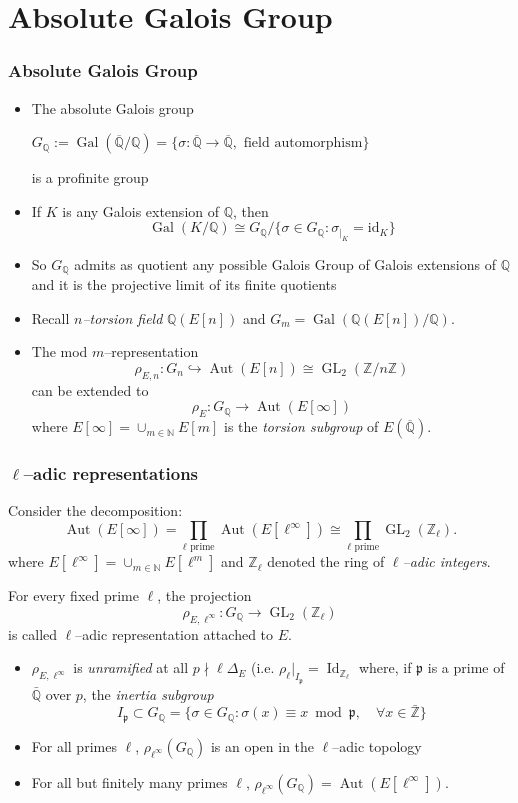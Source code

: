 \documentclass[10pt,final]{beamer} %
\newcommand{\Q}{\mathbb Q}
\newcommand{\Z}{\mathbb Z}
\newcommand{\N}{\mathbb N}
\theoremstyle{definition}
\begin{document}
\section{Absolute Galois Group}
\begin{frame}
\frametitle{Absolute Galois Group} 

\begin{itemize}[<+-| alert@+>]
 \item The absolute Galois group \\
\centerline{$G_\Q:=\operatorname{Gal}(\overline{\Q}/\Q)=\{\sigma:\overline{\Q}\rightarrow\overline{\Q},\text{ field automorphism}\}$}
is a profinite group
\item If $K$ is any Galois extension of $\Q$, then
$$\operatorname{Gal}(K/\Q)\cong G_\Q/\{\sigma\in G_\Q: \sigma_{|_K}=\text{id}_K\}$$
\item
So $G_\Q$ admits as quotient any possible Galois Group of Galois extensions of $\Q$ and it is the projective limit of its finite quotients
\item Recall  \emph{$n$--torsion field} $\Q(E[n])$ and $G_m=\operatorname{Gal}(\Q(E[n])/\Q)$. 
\item The mod $m$--representation
$$\rho_{E,n}: G_n\hookrightarrow\operatorname{Aut}(E[n])\cong \operatorname{GL}_2(\Z/n\Z)$$
can be extended to
$$\rho_E: G_\Q\longrightarrow \operatorname{Aut}(E[\infty])$$
where 
$E[\infty]=\cup_{m\in\N}E[m]$ is the \emph{torsion subgroup} of $E(\overline{\Q})$.
\end{itemize}
\end{frame}

\begin{frame}
\frametitle{$\ell$--adic representations} 

Consider the decomposition:
 $$\operatorname{Aut}(E[\infty])=\prod_{\ell\text{ prime}}\operatorname{Aut}(E[\ell^\infty])
 \cong \prod_{\ell\text{ prime}}\operatorname{GL}_2(\Z_\ell).$$
 where \pause
 $E[\ell^\infty]=\cup_{m\in\N}E[\ell^m]$ and $\Z_\ell$ denoted the ring of \emph{$\ell$--adic integers}.\pause
 
 For every fixed prime $\ell$, the projection
 $$\rho_{E,\ell^\infty}: G_\Q\longrightarrow \operatorname{GL}_2(\Z_\ell)$$
 is called $\ell$--adic representation attached to $E$.\pause

\begin{itemize}[<+-| alert@+>]
 \item  $\rho_{E,\ell^\infty}$ is \emph{unramified} at all  $p\nmid \ell\Delta_E$ (i.e. 
$\rho_\ell|_{I_\mathfrak p}=\operatorname{Id}_{\Z_\ell}$
where, if $\mathfrak p$ is a prime of $\bar{\Q}$ over $p$, the \emph{inertia subgroup} 
$$I_\mathfrak p\subset G_\Q=\{\sigma \in G_\Q: \sigma(x)\equiv x\bmod\mathfrak p,\quad \forall x\in\bar{\Z}\}$$
 \item For all primes $\ell$, $\rho_{\ell^\infty}(G_\Q)$ is an open in the $\ell$--adic topology
 \item For all but finitely many primes $\ell$, $\rho_{\ell^\infty}(G_\Q)=\operatorname{Aut}(E[\ell^\infty])$.
\end{itemize}

\end{frame}
\end{document}
